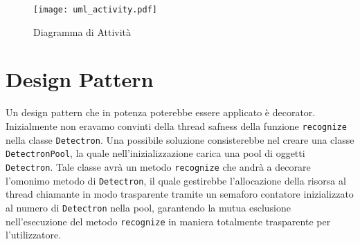 \documentclass[12pt,a4paper]{article}
\begin{document}
\begin{figure}[p]
  \caption{Diagramma di Attività}
  \centering
  \texttt{[image: uml\_activity.pdf]}
\end{figure}

\section{Design Pattern}

Un design pattern che in potenza poterebbe essere applicato è
decorator.\\
Inizialmente non eravamo convinti della thread safness
della funzione \texttt{recognize} nella classe \texttt{Detectron}. Una
possibile soluzione consisterebbe nel creare una classe
\texttt{DetectronPool}, la quale nell'inizializzazione carica una pool
di oggetti \texttt{Detectron}. Tale classe avrà un metodo
\texttt{recognize} che andrà a decorare l'omonimo metodo di
\texttt{Detectron}, il quale gestirebbe l'allocazione della risorsa al
thread chiamante in modo trasparente tramite un semaforo contatore
inizializzato al numero di \texttt{Detectron} nella pool, garantendo la
mutua esclusione nell'esecuzione del metodo \texttt{recognize} in
maniera totalmente trasparente per l'utilizzatore.
\end{document}
